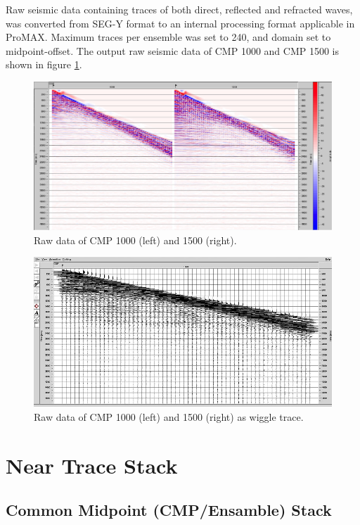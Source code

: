\documentclass[10pt,a4paper]{article}
\begin{document}
Raw seismic data containing traces of both direct, reflected and refracted waves, was converted from SEG-Y format to an internal processing format applicable in ProMAX. Maximum traces per ensemble was set to 240, and domain set to midpoint-offset. The output raw seismic data of CMP 1000 and CMP 1500 is shown in figure \ref{fig2}.

\begin{figure}[H]
\includegraphics[width=\textwidth]{fig2.jpg}
\caption{Raw data of CMP 1000 (left) and 1500 (right).}
\label{fig2}
\end{figure}

\begin{figure}[H]
\includegraphics[width=\textwidth]{rawWiggle.jpg}
\caption{Raw data of CMP 1000 (left) and 1500 (right) as wiggle trace.}
\label{rawWiggle}
\end{figure}

\section{Near Trace Stack}

\subsection{Common Midpoint (CMP/Ensamble) Stack}
\end{document}
